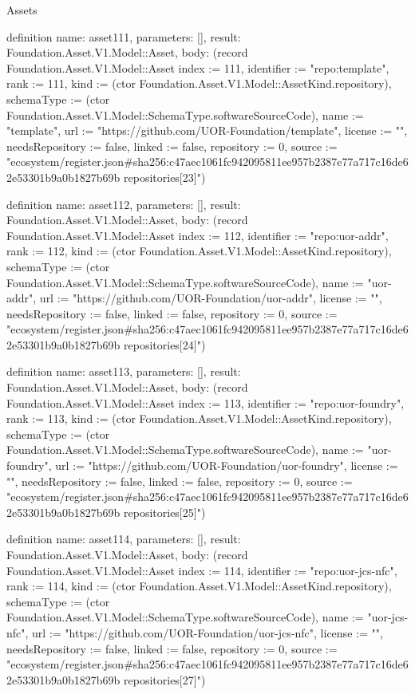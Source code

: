 \begin{lexlean}{Assets}
\begin{semanticmodule}
definition{
  name: asset111,
  parameters: [],
  result: Foundation.Asset.V1.Model::Asset,
  body: (record Foundation.Asset.V1.Model::Asset {index := 111, identifier := "repo:template", rank := 111, kind := (ctor Foundation.Asset.V1.Model::AssetKind.repository), schemaType := (ctor Foundation.Asset.V1.Model::SchemaType.softwareSourceCode), name := "template", url := "https://github.com/UOR-Foundation/template", license := "", needsRepository := false, linked := false, repository := 0, source := "ecosystem/register.json#sha256:c47aec1061fc942095811ee957b2387e77a717c16de62e53301b9a0b1827b69b repositories[23]"})
}

definition{
  name: asset112,
  parameters: [],
  result: Foundation.Asset.V1.Model::Asset,
  body: (record Foundation.Asset.V1.Model::Asset {index := 112, identifier := "repo:uor-addr", rank := 112, kind := (ctor Foundation.Asset.V1.Model::AssetKind.repository), schemaType := (ctor Foundation.Asset.V1.Model::SchemaType.softwareSourceCode), name := "uor-addr", url := "https://github.com/UOR-Foundation/uor-addr", license := "", needsRepository := false, linked := false, repository := 0, source := "ecosystem/register.json#sha256:c47aec1061fc942095811ee957b2387e77a717c16de62e53301b9a0b1827b69b repositories[24]"})
}

definition{
  name: asset113,
  parameters: [],
  result: Foundation.Asset.V1.Model::Asset,
  body: (record Foundation.Asset.V1.Model::Asset {index := 113, identifier := "repo:uor-foundry", rank := 113, kind := (ctor Foundation.Asset.V1.Model::AssetKind.repository), schemaType := (ctor Foundation.Asset.V1.Model::SchemaType.softwareSourceCode), name := "uor-foundry", url := "https://github.com/UOR-Foundation/uor-foundry", license := "", needsRepository := false, linked := false, repository := 0, source := "ecosystem/register.json#sha256:c47aec1061fc942095811ee957b2387e77a717c16de62e53301b9a0b1827b69b repositories[25]"})
}

definition{
  name: asset114,
  parameters: [],
  result: Foundation.Asset.V1.Model::Asset,
  body: (record Foundation.Asset.V1.Model::Asset {index := 114, identifier := "repo:uor-jcs-nfc", rank := 114, kind := (ctor Foundation.Asset.V1.Model::AssetKind.repository), schemaType := (ctor Foundation.Asset.V1.Model::SchemaType.softwareSourceCode), name := "uor-jcs-nfc", url := "https://github.com/UOR-Foundation/uor-jcs-nfc", license := "", needsRepository := false, linked := false, repository := 0, source := "ecosystem/register.json#sha256:c47aec1061fc942095811ee957b2387e77a717c16de62e53301b9a0b1827b69b repositories[27]"})
}


\end{semanticmodule}
\end{lexlean}
